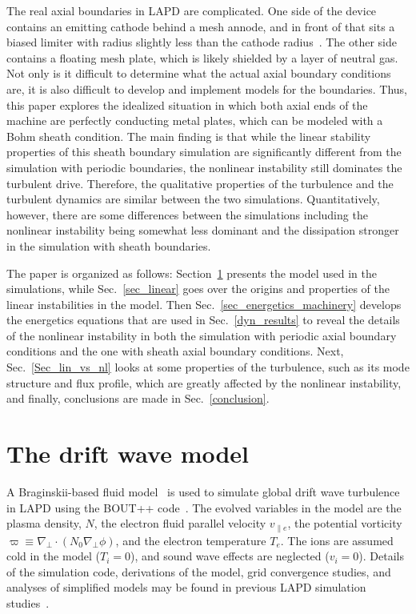 \documentclass[showpacs,preprintnumbers,amsmath,amssymb,superscriptaddress,aip]{revtex4-1}
\def\grad{\nabla}
\newcommand{\gradperp}{\grad_\perp}
\newcommand{\vpe}{v_{\parallel e}}
\begin{document}
The real axial boundaries in LAPD are complicated. One side of the device contains an emitting cathode behind a mesh annode, and in front of that sits a biased limiter with radius slightly
less than the cathode radius~\cite{schaffner2012}.
The other side contains a floating mesh plate, which is likely shielded by a layer of neutral gas. Not only is it difficult to determine what the actual axial boundary conditions are, it is also
difficult to develop and implement models for the boundaries. Thus, this paper explores the idealized situation in which both axial ends of the machine are
perfectly conducting metal plates, which can be modeled with a Bohm sheath condition. The main finding is that while the linear stability properties of this sheath boundary simulation are significantly 
different from the simulation with periodic boundaries, the nonlinear instability still dominates the turbulent drive. Therefore, the qualitative properties of the turbulence and the turbulent
dynamics are similar between the two simulations. Quantitatively, however, there are some differences between the simulations
including the nonlinear instability being somewhat less dominant and the dissipation stronger in the simulation with sheath boundaries.

The paper is organized as follows: Section~\ref{dw_model} presents the model used in the simulations, while 
Sec.~\ref{sec_linear} goes over the origins and properties of the linear instabilities in the model.
Then Sec.~\ref{sec_energetics_machinery} develops the energetics equations that are used in Sec.~\ref{dyn_results} to reveal the details of the nonlinear instability in both the simulation
with periodic axial boundary conditions and the one with sheath axial boundary conditions. Next, Sec.~\ref{Sec_lin_vs_nl} looks at some properties of the turbulence, such as its mode structure
and flux profile, which are greatly affected by the nonlinear instability, and finally, conclusions are made in Sec.~\ref{conclusion}.


\section{The drift wave model}
\label{dw_model}

A Braginskii-based fluid model~\cite{Braginskii1965} is used to simulate global drift wave turbulence in LAPD using the BOUT++ code~\cite{dudson2009}. 
The evolved variables in the model are the plasma density, $N$, the electron fluid parallel velocity $\vpe$, the potential vorticity $\varpi \equiv \gradperp \cdot (N_0 \gradperp \phi)$,
and the electron temperature $T_e$. The ions are assumed cold in the
model ($T_i = 0$), and sound wave effects are neglected ($v_i = 0$). Details of the simulation code, derivations of the model, grid convergence studies, and analyses of simplified models
may be found in previous LAPD simulation studies~\cite{Popovich2010a,Popovich2010b,Umansky2011,friedman2012,friedman2012b}.
\end{document}
